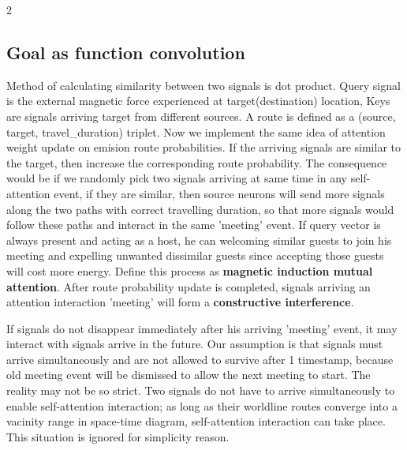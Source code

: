 \documentclass[11pt,a4paper]{article}
\begin{document}
\begin{multicols} {2}
  \subsection{Goal as function convolution}
  Method of calculating similarity between two signals is dot product.  
  Query signal is the external magnetic force experienced at target(destination) location, Keys are signals arriving target from different sources. A route is defined as a (source, target, travel\_duration) triplet. 
  Now we implement the same idea of attention weight update on emision route probabilities. If the arriving signals are similar to the target, then increase the corresponding route probability. The consequence would be if we randomly pick two signals arriving at same time in any self-attention event, 
  if they are similar, then source neurons will send more signals along the two paths with correct travelling duration, so that more signals would follow these paths and interact in the same 'meeting' event. 
  If query vector is always present and acting as a host, he can welcoming similar guests to join his meeting and expelling unwanted dissimilar guests since accepting those guests will cost more energy. 
  Define this process as \textbf{magnetic induction mutual attention}. After route probability update is completed, signals arriving an attention interaction 'meeting' will form a \textbf{constructive interference}.  
  
  If signals do not disappear immediately after his arriving 'meeting' event, it may interact with signals arrive in the future. 
  Our assumption is that signals must arrive simultaneously and are not allowed to survive after 1 timestamp, because old meeting event will be dismissed to allow the next meeting to start. 
  The reality may not be so strict. Two signals do not have to arrive simultaneously to enable self-attention interaction; as long as their worldline routes converge into a vacinity range in space-time diagram, 
  self-attention interaction can take place. This situation is ignored for simplicity reason. 
  

\end{multicols}
\end{document}
